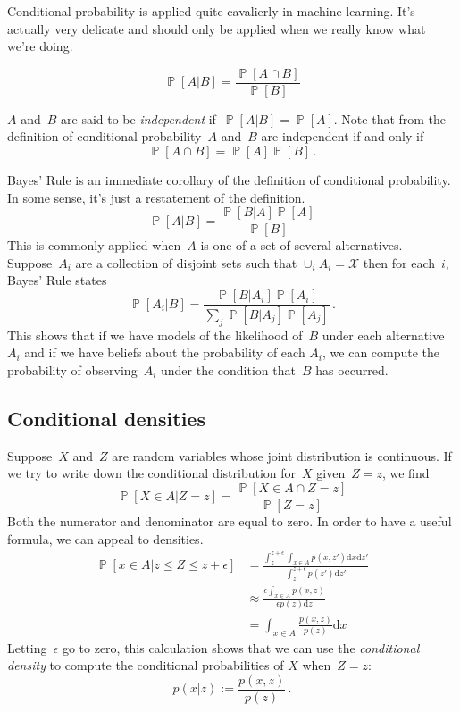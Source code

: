 \documentclass{tufte-book}
\begin{document}
Conditional probability is applied quite cavalierly in machine learning.
It's actually very delicate and should only be applied when we really
know what we're doing.

\[
  \mathop\mathbb{P}[A|B] = \frac{\mathop\mathbb{P}[A\cap B]}{\mathop\mathbb{P}[B]}
\]

\(A\) and~\(B\) are said to be \emph{independent}
if~\(\mathop\mathbb{P}[A|B] = \mathop\mathbb{P}[A]\). Note that from the
definition of conditional probability~\(A\) and~\(B\) are independent if
and only if \[
  \mathop\mathbb{P}[A\cap B] = \mathop\mathbb{P}[A]\mathop\mathbb{P}[B]\,.
\]

Bayes' Rule is an immediate corollary of the definition of conditional
probability. In some sense, it's just a restatement of the definition.
\[
\mathop\mathbb{P}[A|B] = \frac{\mathop\mathbb{P}[B|A]\mathop\mathbb{P}[A]}{\mathop\mathbb{P}[B]}
\] This is commonly applied when~\(A\) is one of a set of several
alternatives. Suppose~\(A_i\) are a collection of disjoint sets such
that \(\cup_i A_i = \mathcal{X}\) then for each~\(i\), Bayes' Rule
states \[
  \mathop\mathbb{P}[A_i|B] = \frac{\mathop\mathbb{P}[B|A_i] \mathop\mathbb{P}[A_i]}{\sum_j \mathop\mathbb{P}[B|A_j] \mathop\mathbb{P}[A_j]}\,.
\] This shows that if we have models of the likelihood of~\(B\) under
each alternative~\(A_i\) and if we have beliefs about the probability of
each \(A_i\), we can compute the probability of observing~\(A_i\) under
the condition that~\(B\) has occurred.

\hypertarget{conditional-densities}{%
\subsection{Conditional densities}\label{conditional-densities}}

Suppose~\(X\) and~\(Z\) are random variables whose joint distribution is
continuous. If we try to write down the conditional distribution
for~\(X\) given~\(Z=z\), we find \[
  \mathop\mathbb{P}[X\in A | Z=z] = \frac{  \mathop\mathbb{P}[X\in A \cap Z=z] } {\mathop\mathbb{P}[Z=z]}
\] Both the numerator and denominator are equal to zero. In order to
have a useful formula, we can appeal to densities. \[
\begin{aligned}
  \mathop\mathbb{P}[x \in A  | z \leq Z \leq z+\epsilon ] &= \frac{  \int_{z}^{z+\epsilon} \int_{x \in A} p(x,z') \mathrm{d} x \mathrm{d} z' } {\int_{z}^{z+\epsilon}  p(z') \mathrm{d} z' }\\
  &\approx \frac{  \epsilon \int_{x\in A} p(x,z) } { \epsilon  p(z) \mathrm{d} z } \\
  &= \int_{x\in A} \frac{p(x,z)}{p(z)} \mathrm{d} x
\end{aligned}
\] Letting~\(\epsilon\) go to zero, this calculation shows that we can
use the \emph{conditional density} to compute the conditional
probabilities of \(X\) when~\(Z=z\): \[
  p(x|z) := \frac{p(x,z)}{p(z)}\,.
\]
\end{document}
